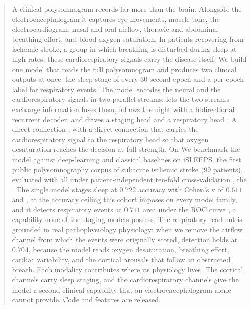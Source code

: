 \documentclass[preprint,12pt]{elsarticle}
\newcommand{\mmAcc}{0.722}
\newcommand{\mmK}{0.611}
\newcommand{\mmAuc}{0.711}
\newcommand{\noflowAuc}{0.704}
\providecommand{\DIFaddtex}[1]{{\protect\color{blue} \sf #1}} %
\providecommand{\DIFdeltex}[1]{{\protect\color{red} \scriptsize #1}} %
\providecommand{\DIFaddbegin}{} %
\providecommand{\DIFaddend}{} %
\providecommand{\DIFdelbegin}{} %
\providecommand{\DIFdelend}{} %
\providecommand{\DIFadd}[1]{\texorpdfstring{\DIFaddtex{#1}}{#1}} %
\providecommand{\DIFdel}[1]{\texorpdfstring{\DIFdeltex{#1}}{}} %
\providecommand{\DIFscaledelfig}{0.5}
\newlength{\DIFdelgraphicswidth} %
\newlength{\DIFdelgraphicsheight} %
\providecommand{\DIFaddincludegraphics}[2][]{{\color{blue}\fbox{\DIFOincludegraphics[#1]{#2}}}} %
\providecommand{\DIFdelincludegraphics}[2][]{%
\sbox{\DIFdelgraphicsbox}{\DIFOincludegraphics[#1]{#2}}%
\settoboxwidth{\DIFdelgraphicswidth}{\DIFdelgraphicsbox} %
\settoboxtotalheight{\DIFdelgraphicsheight}{\DIFdelgraphicsbox} %
\scalebox{\DIFscaledelfig}{%
\parbox[b]{\DIFdelgraphicswidth}{\usebox{\DIFdelgraphicsbox}\\[-\baselineskip] \rule{\DIFdelgraphicswidth}{0em}}\llap{\resizebox{\DIFdelgraphicswidth}{\DIFdelgraphicsheight}{%
\setlength{\unitlength}{\DIFdelgraphicswidth}%
\begin{picture}(1,1)%
\thicklines\linethickness{2pt} %
{\color[rgb]{1,0,0}\put(0,0){\framebox(1,1){}}}%
{\color[rgb]{1,0,0}\put(0,0){\line( 1,1){1}}}%
{\color[rgb]{1,0,0}\put(0,1){\line(1,-1){1}}}%
\end{picture}%
}\hspace*{3pt}}} %
} %
\DeclareRobustCommand{\DIFaddbegin}{\DIFOaddbegin \let\includegraphics\DIFaddincludegraphics} %
\DeclareRobustCommand{\DIFaddend}{\DIFOaddend \let\includegraphics\DIFOincludegraphics} %
\DeclareRobustCommand{\DIFdelbegin}{\DIFOdelbegin \let\includegraphics\DIFdelincludegraphics} %
\DeclareRobustCommand{\DIFdelend}{\DIFOaddend \let\includegraphics\DIFOincludegraphics} %
\begin{document}
\begin{frontmatter}
\begin{abstract}
A clinical polysomnogram records far more than the brain. Alongside the
electroencephalogram it captures eye movements, muscle tone, the electrocardiogram,
nasal and oral airflow, thoracic and abdominal breathing effort, and blood oxygen
saturation. In patients recovering from ischemic stroke, a group in which breathing is
disturbed during sleep at high rates, these cardiorespiratory signals carry the disease
itself. We build one model that reads the full polysomnogram and produces two clinical
outputs at once: the sleep stage of every 30-second epoch and a per-epoch label for
respiratory events. The model encodes the neural and the cardiorespiratory signals in two
parallel streams, \DIFdelbegin \DIFdel{lets the two streams exchange information}\DIFdelend \DIFaddbegin \DIFadd{fuses them}\DIFaddend , follows the night with a bidirectional recurrent decoder, and
drives a staging head and a respiratory head\DIFdelbegin \DIFdel{. A
direct connection }\DIFdelend \DIFaddbegin \DIFadd{, with a direct connection that }\DIFaddend carries the
cardiorespiratory signal to the respiratory head so \DIFdelbegin \DIFdel{that
}\DIFdelend oxygen desaturation reaches the decision at
full strength. \DIFdelbegin \DIFdel{On }\DIFdelend \DIFaddbegin \DIFadd{We benchmark
the model against deep-learning and classical baselines on }\DIFaddend iSLEEPS, the first public
polysomnography corpus of subacute ischemic stroke (99 patients), \DIFdelbegin \DIFdel{evaluated with
}\DIFdelend \DIFaddbegin \DIFadd{all under }\DIFaddend patient-independent ten-fold
cross-validation\DIFdelbegin \DIFdel{, the }\DIFdelend \DIFaddbegin \DIFadd{. The }\DIFaddend single model stages sleep at $\mmAcc$ accuracy with Cohen's $\kappa$
of $\mmK$\DIFdelbegin \DIFdel{and }\DIFdelend \DIFaddbegin \DIFadd{, at the accuracy ceiling this cohort imposes on every model family, and it }\DIFaddend detects
respiratory events at $\mmAuc$ area under the ROC curve\DIFaddbegin \DIFadd{, a capability none of the staging
models possess}\DIFaddend . The respiratory read-out is grounded in \DIFdelbegin \DIFdel{real pathophysiology}\DIFdelend \DIFaddbegin \DIFadd{physiology}\DIFaddend : when we remove the
airflow channel from which the events were \DIFdelbegin \DIFdel{originally }\DIFdelend scored, detection holds at $\noflowAuc$, because
the model reads oxygen desaturation, breathing effort, cardiac variability, and the cortical
arousals that follow an obstructed breath. Each modality contributes where its physiology
lives. \DIFdelbegin \DIFdel{The cortical channels carry sleep staging, and the
cardiorespiratory channels give the model a second clinical capability that an
electroencephalogram alone cannot provide. }\DIFdelend Code and features are released.
\end{abstract}


\end{frontmatter}
\end{document}

